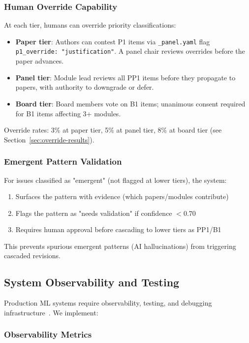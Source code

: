\subsubsection{Human Override Capability}

At each tier, humans can override priority classifications:
\begin{itemize}
\item \textbf{Paper tier}: Authors can contest P1 items via \texttt{\_panel.yaml} flag \texttt{p1\_override: "justification"}. A panel chair reviews overrides before the paper advances.
\item \textbf{Panel tier}: Module lead reviews all PP1 items before they propagate to papers, with authority to downgrade or defer.
\item \textbf{Board tier}: Board members vote on B1 items; unanimous consent required for B1 items affecting 3+ modules.
\end{itemize}

Override rates: 3\% at paper tier, 5\% at panel tier, 8\% at board tier (see Section~\ref{sec:override-results}).

\subsubsection{Emergent Pattern Validation}

For issues classified as "emergent" (not flagged at lower tiers), the system:
\begin{enumerate}
\item Surfaces the pattern with evidence (which papers/modules contribute)
\item Flags the pattern as "needs validation" if confidence $< 0.70$
\item Requires human approval before cascading to lower tiers as PP1/B1
\end{enumerate}

This prevents spurious emergent patterns (AI hallucinations) from triggering cascaded revisions.

\subsection{System Observability and Testing}
\label{sec:observability}

Production ML systems require observability, testing, and debugging infrastructure~\cite{shankar2022operationalizing}. We implement:

\subsubsection{Observability Metrics}

